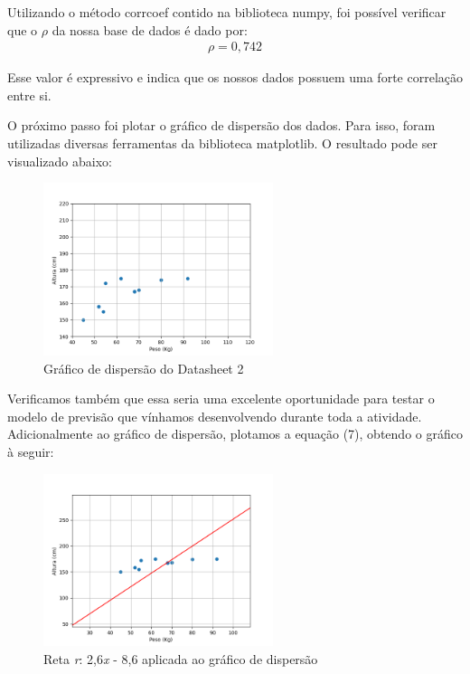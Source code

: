 \documentclass{article}
\begin{document}
    Utilizando o método corrcoef contido na biblioteca numpy, foi possível verificar que o $\rho$ da nossa base de dados é dado por:
    \begin{align*}
        \rho = 0,742
    \end{align*}

    Esse valor é expressivo e indica que os nossos dados possuem uma forte correlação entre si.

    O próximo passo foi plotar o gráfico de dispersão dos dados. Para isso, foram utilizadas diversas ferramentas da biblioteca matplotlib. O resultado pode ser visualizado abaixo:
    \newpage
    \begin{center}
        \begin{figure}[ht]
            \centering
            \includegraphics[width=0.6\textwidth]{Figure_1.png}
            \caption{Gráfico de dispersão do Datasheet 2}
            \label{fig:enter-label}
        \end{figure}
    \end{center}
    
    Verificamos também que essa seria uma excelente oportunidade para testar o modelo de previsão que vínhamos desenvolvendo durante toda a atividade. Adicionalmente ao gráfico de dispersão, plotamos a equação (7), obtendo o gráfico à seguir:
    \begin{center}
        \begin{figure}[ht]
            \centering
            \includegraphics[width=0.6\textwidth]{Figure_2.png}
            \caption{Reta \textit{r}: 2,6\textit{x} - 8,6 aplicada ao gráfico de dispersão}
            \label{fig:enter-label}
        \end{figure}
    \end{center}
\end{document}
